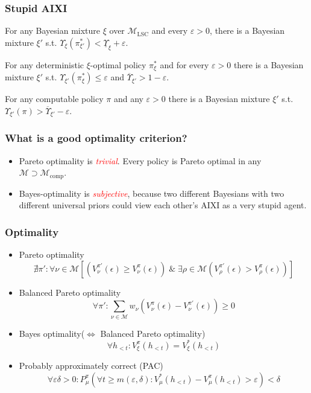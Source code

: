 \documentclass[UTF8,11pt,colorlinks,compress,openany]{beamer}%
\begin{document}
\begin{frame}\frametitle{Stupid AIXI}
\setlength\abovedisplayskip{0pt}
\setlength\belowdisplayskip{0pt}
	\begin{theorem}
		For any Bayesian mixture $\xi$ over $\mathcal{M}_{\mathrm{LSC}}$ and every $\varepsilon> 0$, there is a Bayesian mixture $\xi'$ s.t. $\Upsilon_\xi(\pi_{\xi'}^*)<\underline{\Upsilon}_\xi+\varepsilon$.
	\end{theorem}
	\begin{theorem}
		For any deterministic $\xi$-optimal policy $\pi_\xi^*$ and for every $\varepsilon> 0$ there is a Bayesian mixture $\xi'$ s.t. $\Upsilon_{\xi'}(\pi_\xi^*)\leq\varepsilon$ and $\overline{\Upsilon}_{\xi'}>1-\varepsilon$.
	\end{theorem}
	\begin{theorem}
		For any computable policy $\pi$ and any $\varepsilon> 0$ there is a Bayesian mixture $\xi'$ s.t. $\Upsilon_{\xi'}(\pi)>\overline{\Upsilon}_{\xi'}-\varepsilon$.
	\end{theorem}
\end{frame}

\begin{frame}\frametitle{What is a good optimality criterion?}
	\begin{itemize}
		\item Pareto optimality is \textcolor{red}{\emph{trivial}}. Every policy is Pareto optimal in any $\mathcal{M}\supset\mathcal{M}_{\mathrm{comp}}$.
		\item Bayes-optimality is \textcolor{red}{\emph{subjective}}, because two different Bayesians with two different universal priors could view each other's AIXI as a very stupid agent.
	\end{itemize}
\end{frame}

\begin{frame}\frametitle{Optimality}
	\begin{itemize}
		\item Pareto optimality
		\[\nexists\pi': \forall\nu\in\mathcal{M}\left[\left(V_\nu^{\pi'}(\epsilon)\geq V_\nu^\pi(\epsilon)\right)\;\&\;\exists\rho\in\mathcal{M}\left(V_\rho^{\pi'}(\epsilon) > V_\rho^\pi(\epsilon)\right)\right]\]
		\item Balanced Pareto optimality
		\[\forall\pi':\sum\limits_{\nu\in\mathcal{M}} w_\nu\left(V_\nu^\pi(\epsilon)- V_\nu^{\pi'}(\epsilon)\right)\geq 0\]
		\item Bayes optimality($\iff$ Balanced Pareto optimality)
		\[\forall h_{<t}: V_\xi^\pi(h_{<t})=V_\xi^*(h_{<t})\]
		\item Probably approximately correct (PAC)
		\[\forall \varepsilon\delta>0: P_\mu^\pi\left(\forall t\geq m(\varepsilon,\delta): V_\mu^*(h_{<t})-V_\mu^\pi(h_{<t})> \varepsilon\right)<\delta\]
	\end{itemize}
\end{frame}
\end{document}
